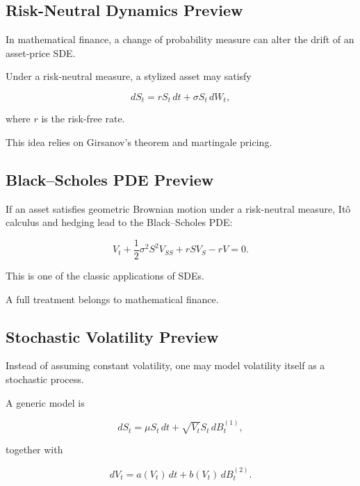 \subsection{Risk-Neutral Dynamics Preview}
\label{subsec:risk-neutral-dynamics-preview}

In mathematical finance, a change of probability measure can alter the
drift of an asset-price SDE.

Under a risk-neutral measure, a stylized asset may satisfy

\[
\boxed{
dS_t
=
rS_t\,dt
+
\sigma S_t\,dW_t,
}
\]

where \(r\) is the risk-free rate.

This idea relies on Girsanov's theorem and martingale pricing.

\subsection{Black--Scholes PDE Preview}
\label{subsec:black-scholes-pde-preview}

If an asset satisfies geometric Brownian motion under a risk-neutral
measure, It\^o calculus and hedging lead to the Black--Scholes PDE:

\[
\boxed{
V_t
+
\frac12
\sigma^2S^2V_{SS}
+
rSV_S
-
rV
=
0.
}
\]

This is one of the classic applications of SDEs.

A full treatment belongs to mathematical finance.

\subsection{Stochastic Volatility Preview}
\label{subsec:stochastic-volatility-preview}

Instead of assuming constant volatility, one may model volatility itself
as a stochastic process.

A generic model is

\[
\boxed{
dS_t
=
\mu S_t\,dt
+
\sqrt{V_t}S_t\,dB_t^{(1)},
}
\]

together with

\[
\boxed{
dV_t
=
a(V_t)\,dt
+
b(V_t)\,dB_t^{(2)}.
}
\]

